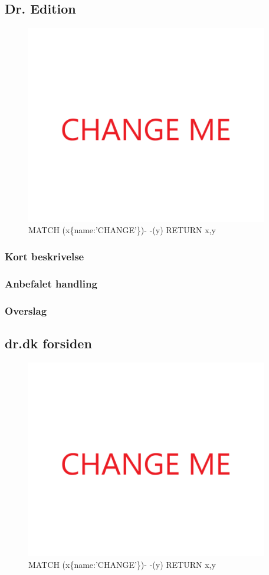 \documentclass{article}
\begin{document}
\subsection{Dr. Edition}
\begin{figure}[h]
\includegraphics[width=300pt]{CHANGE.PNG}
\caption{MATCH (x\{name:'CHANGE'\})- -(y) RETURN x,y}
\end{figure}
\subsubsection{Kort beskrivelse}
\subsubsection{Anbefalet handling}
\subsubsection{Overslag}
\subsection{dr.dk forsiden}
\begin{figure}[h]
\includegraphics[width=300pt]{CHANGE.PNG}
\caption{MATCH (x\{name:'CHANGE'\})- -(y) RETURN x,y}
\end{figure}
\end{document}
